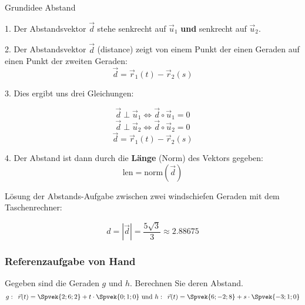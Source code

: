 \begin{rezept}{Grundidee Abstand}{}

  1. Der Abstandsvektor $\vec{d}$ stehe senkrecht auf $\vec{u}_1$
  \textbf{und} senkrecht auf $\vec{u}_2$.

  2. Der Abstandsvektor $\vec{d}$ (distance) zeigt von einem Punkt der einen Geraden auf
  einen Punkt der zweiten Geraden: $$\vec{d}=\vec{r}_1(t) - \vec{r}_2(s)$$

  3. Dies ergibt uns drei Gleichungen:

  $$\vec{d}\perp\vec{u}_1 \Longleftrightarrow{}  \vec{d}\circ{}\vec{u}_1 = 0$$
  $$\vec{d}\perp\vec{u}_2 \Longleftrightarrow{}  \vec{d}\circ{}\vec{u}_2 = 0$$
  $$\vec{d}=\vec{r}_1(t)-\vec{r}_2(s)$$

  4. Der Abstand ist dann durch die \textbf{Länge} (Norm) des Vektors gegeben:
  $$\text{len} = \text{norm}(\vec{d})$$
  
\end{rezept}
\newpage


Lösung der Abstands-Aufgabe zwischen zwei windschiefen Geraden mit dem
Taschenrechner:
\TRAINER{}


$$d = |\vec{d} | = \frac{5\sqrt{3}}{3} \approx 2.88675$$
\newpage
\subsubsection*{Referenzaufgabe von Hand}

Gegeben sind die Geraden $g$ und $h$. Berechnen Sie deren Abstand.
$$g: \,\,\, \vec{r}(t) = \Spvek{2;6;2} + t\cdot{}\Spvek{0;1;0} \text{
  und }  h: \,\,\, \vec{r}(t) = \Spvek{6;-2;8} + s\cdot{}\Spvek{-3;1;0} $$


